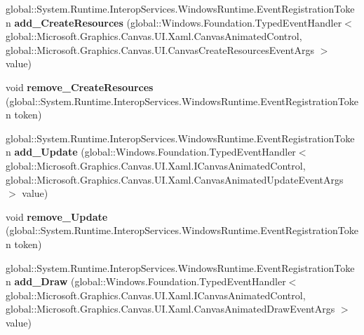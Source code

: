 \begin{DoxyCompactItemize}
global\+::\+System.\+Runtime.\+Interop\+Services.\+Windows\+Runtime.\+Event\+Registration\+Token {\bfseries add\+\_\+\+Create\+Resources} (global\+::\+Windows.\+Foundation.\+Typed\+Event\+Handler$<$ global\+::\+Microsoft.\+Graphics.\+Canvas.\+U\+I.\+Xaml.\+Canvas\+Animated\+Control, global\+::\+Microsoft.\+Graphics.\+Canvas.\+U\+I.\+Canvas\+Create\+Resources\+Event\+Args $>$ value)
\item 
\mbox{\label{class_microsoft_1_1_graphics_1_1_canvas_1_1_u_i_1_1_xaml_1_1_canvas_animated_control_a44a43d134b2c41ea2ec6eddf26aadd31}} 
void {\bfseries remove\+\_\+\+Create\+Resources} (global\+::\+System.\+Runtime.\+Interop\+Services.\+Windows\+Runtime.\+Event\+Registration\+Token token)
\item 
\mbox{\label{class_microsoft_1_1_graphics_1_1_canvas_1_1_u_i_1_1_xaml_1_1_canvas_animated_control_aa7a0e408eb82cfc307935e5bb671c4b8}} 
global\+::\+System.\+Runtime.\+Interop\+Services.\+Windows\+Runtime.\+Event\+Registration\+Token {\bfseries add\+\_\+\+Update} (global\+::\+Windows.\+Foundation.\+Typed\+Event\+Handler$<$ global\+::\+Microsoft.\+Graphics.\+Canvas.\+U\+I.\+Xaml.\+I\+Canvas\+Animated\+Control, global\+::\+Microsoft.\+Graphics.\+Canvas.\+U\+I.\+Xaml.\+Canvas\+Animated\+Update\+Event\+Args $>$ value)
\item 
\mbox{\label{class_microsoft_1_1_graphics_1_1_canvas_1_1_u_i_1_1_xaml_1_1_canvas_animated_control_a16a7c17d34f9282e536a02fcb511bb4e}} 
void {\bfseries remove\+\_\+\+Update} (global\+::\+System.\+Runtime.\+Interop\+Services.\+Windows\+Runtime.\+Event\+Registration\+Token token)
\item 
\mbox{\label{class_microsoft_1_1_graphics_1_1_canvas_1_1_u_i_1_1_xaml_1_1_canvas_animated_control_afacf0f7ca405ccd98c5a6ae333a7fc12}} 
global\+::\+System.\+Runtime.\+Interop\+Services.\+Windows\+Runtime.\+Event\+Registration\+Token {\bfseries add\+\_\+\+Draw} (global\+::\+Windows.\+Foundation.\+Typed\+Event\+Handler$<$ global\+::\+Microsoft.\+Graphics.\+Canvas.\+U\+I.\+Xaml.\+I\+Canvas\+Animated\+Control, global\+::\+Microsoft.\+Graphics.\+Canvas.\+U\+I.\+Xaml.\+Canvas\+Animated\+Draw\+Event\+Args $>$ value)

\end{DoxyCompactItemize}
